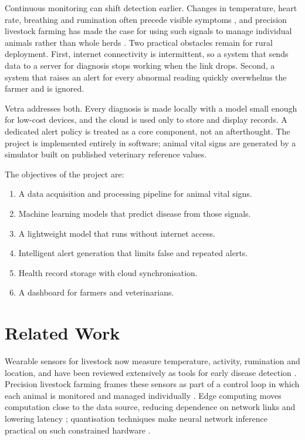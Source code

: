 \documentclass[conference]{IEEEtran}
\begin{document}
Continuous monitoring can shift detection earlier. Changes in temperature,
heart rate, breathing and rumination often precede visible symptoms
\cite{neethirajan2017}, and precision livestock farming has made the case for
using such signals to manage individual animals rather than whole herds
\cite{berckmans2017}. Two practical obstacles remain for rural deployment.
First, internet connectivity is intermittent, so a system that sends data to a
server for diagnosis stops working when the link drops. Second, a system that
raises an alert for every abnormal reading quickly overwhelms the farmer and is
ignored.

Vetra addresses both. Every diagnosis is made locally with a model small enough
for low-cost devices, and the cloud is used only to store and display records.
A dedicated alert policy is treated as a core component, not an afterthought.
The project is implemented entirely in software; animal vital signs are
generated by a simulator built on published veterinary reference values.

The objectives of the project are:
\begin{enumerate}
\item A data acquisition and processing pipeline for animal vital signs.
\item Machine learning models that predict disease from those signals.
\item A lightweight model that runs without internet access.
\item Intelligent alert generation that limits false and repeated alerts.
\item Health record storage with cloud synchronisation.
\item A dashboard for farmers and veterinarians.
\end{enumerate}

\section{Related Work}
Wearable sensors for livestock now measure temperature, activity, rumination
and location, and have been reviewed extensively as tools for early disease
detection \cite{neethirajan2017}. Precision livestock farming frames these
sensors as part of a control loop in which each animal is monitored and managed
individually \cite{berckmans2017}. Edge computing moves computation close to the
data source, reducing dependence on network links and lowering latency
\cite{shi2016edge}; quantisation techniques make neural network inference
practical on such constrained hardware \cite{jacob2018quant}.
\end{document}

